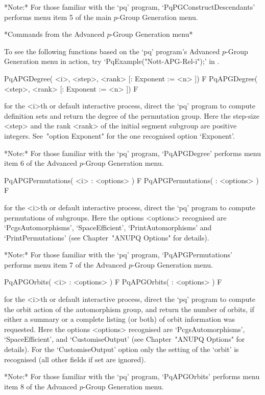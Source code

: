 *Note:* 
For those  familiar  with  the  `pq'  program,  `PqPGConstructDescendants'
performs menu item 5 of the main $p$-Group Generation menu.

*Commands from the Advanced $p$-Group Generation menu*

To see the following  functions  based  on  the  `pq'  program's  Advanced
$p$-Group Generation menu in action,  try  `PqExample("Nott-APG-Rel-i");'
in {\GAP}.

\>PqAPGDegree( <i>, <step>, <rank> [: Exponent := <n> ]) F
\>PqAPGDegree( <step>, <rank> [: Exponent := <n> ]) F

for the <i>th or default interactive {\ANUPQ} process,  direct  the  `pq'
program  to  compute  definition  sets  and  return  the  degree  of   the
permutation group. Here the step-size <step> and the rank <rank>  of  the
initial segment subgroup are positive integers. See~"option Exponent" for
the one recognised option `Exponent'.

*Note:* For those familiar with the `pq' program,  `PqAPGDegree'  performs
menu item 6 of the Advanced $p$-Group Generation menu.

\>PqAPGPermutations( <i> : <options> ) F
\>PqAPGPermutations( : <options> ) F

for the <i>th or default interactive {\ANUPQ} process,  direct  the  `pq'
program to compute permutations of subgroups. Here the  options  <options>
recognised       are        `PcgsAutomorphisms',        `SpaceEfficient',
`PrintAutomorphisms' and `PrintPermutations' (see Chapter~"ANUPQ Options"
for details).

*Note:* For those familiar  with  the  `pq'  program,  `PqAPGPermutations'
performs menu item 7 of the Advanced $p$-Group Generation menu.

\>PqAPGOrbits( <i> : <options> ) F
\>PqAPGOrbits( : <options> ) F

for the <i>th or default interactive {\ANUPQ} process,  direct  the  `pq'
program to compute the orbit action of the automorphism group, and  return
the number of orbits, if either a summary or a complete listing (or both)
of orbit information was requested. Here the options <options> recognised
are `PcgsAutomorphisms',  `SpaceEfficient',  and  `CustomiseOutput'  (see
Chapter~"ANUPQ Options" for details). For  the  `CustomiseOutput'  option
only the setting of the `orbit' is recognised (all other  fields  if  set
are ignored).

*Note:* For those familiar with the `pq' program,  `PqAPGOrbits'  performs
menu item 8 of the Advanced $p$-Group Generation menu.

